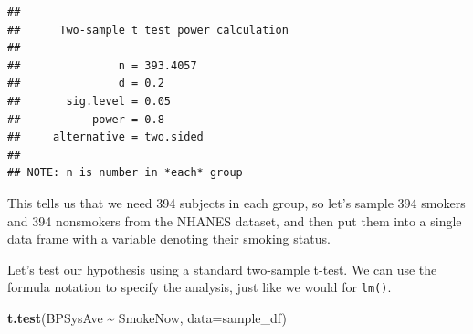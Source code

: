 \documentclass[
  12pt,
]{book}
\newenvironment{Shaded}{\begin{snugshade}}{\end{snugshade}}
\newcommand{\AttributeTok}[1]{\textcolor[rgb]{0.13,0.29,0.53}{#1}}
\newcommand{\FunctionTok}[1]{\textcolor[rgb]{0.13,0.29,0.53}{\textbf{#1}}}
\newcommand{\NormalTok}[1]{#1}
\newcommand{\OtherTok}[1]{\textcolor[rgb]{0.56,0.35,0.01}{#1}}
\newcommand{\SpecialCharTok}[1]{\textcolor[rgb]{0.81,0.36,0.00}{\textbf{#1}}}
\newcommand{\StringTok}[1]{\textcolor[rgb]{0.31,0.60,0.02}{#1}}
\begin{document}
\begin{verbatim}
## 
##      Two-sample t test power calculation 
## 
##               n = 393.4057
##               d = 0.2
##       sig.level = 0.05
##           power = 0.8
##     alternative = two.sided
## 
## NOTE: n is number in *each* group
\end{verbatim}

This tells us that we need 394 subjects in each group, so let's sample 394 smokers and 394 nonsmokers from the NHANES dataset, and then put them into a single data frame with a variable denoting their smoking status.

\begin{Shaded}
\end{Shaded}

Let's test our hypothesis using a standard two-sample t-test. We can use the formula notation to specify the analysis, just like we would for \texttt{lm()}.

\begin{Shaded}
\begin{Highlighting}[]
\FunctionTok{t.test}\NormalTok{(BPSysAve }\SpecialCharTok{\textasciitilde{}}\NormalTok{ SmokeNow, }\AttributeTok{data=}\NormalTok{sample\_df)}
\end{Highlighting}
\end{Shaded}
\end{document}
